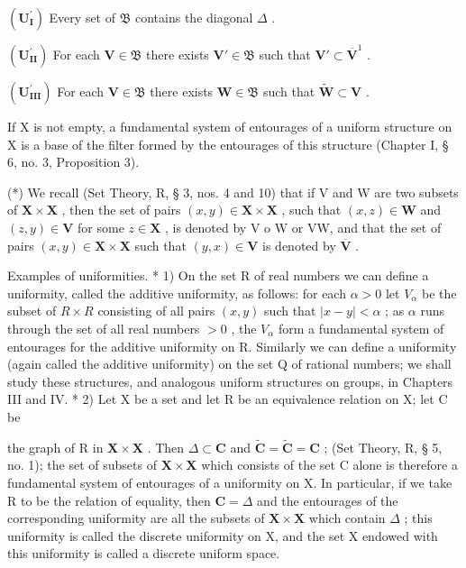 \((\mathbf{U}_{\mathbf{I}}^{\prime})\) Every set of \(\mathfrak{B}\) contains the diagonal \(\Delta\) .

\((\mathbf{U}_{\mathbf{II}}^{\prime})\) For each \(\mathbf{V} \in \mathfrak{B}\) there exists \(\mathbf{V}' \in \mathfrak{B}\) such that \(\mathbf{V}' \subset \overline{\mathbf{V}}^1\) .

\((\mathbf{U}_{\mathbf{III}}^{\prime})\) For each \(\mathbf{V} \in \mathfrak{B}\) there exists \(\mathbf{W} \in \mathfrak{B}\) such that \(\tilde{\mathbf{W}} \subset \mathbf{V}\) .

If X is not empty, a fundamental system of entourages of a uniform structure on X is a base of the filter formed by the entourages of this structure (Chapter I, § 6, no. 3, Proposition 3).

(*) We recall (Set Theory, R, § 3, nos. 4 and 10) that if V and W are two subsets of \(\mathbf{X} \times \mathbf{X}\) , then the set of pairs \((x, y) \in \mathbf{X} \times \mathbf{X}\) , such that \((x, z) \in \mathbf{W}\) and \((z, y) \in \mathbf{V}\) for some \(z \in \mathbf{X}\) , is denoted by V o W or VW, and that the set of pairs \((x, y) \in \mathbf{X} \times \mathbf{X}\) such that \((y, x) \in \mathbf{V}\) is denoted by \(\overline{\mathbf{V}}\) .

Examples of uniformities. * 1) On the set R of real numbers we can define a uniformity, called the additive uniformity, as follows: for each \(\alpha > 0\) let \(V_{\alpha}\) be the subset of \(R \times R\) consisting of all pairs \((x, y)\) such that \(|x - y| < \alpha\) ; as \(\alpha\) runs through the set of all real numbers \(> 0\) , the \(V_{\alpha}\) form a fundamental system of entourages for the additive uniformity on R. Similarly we can define a uniformity (again called the additive uniformity) on the set Q of rational numbers; we shall study these structures, and analogous uniform structures on groups, in Chapters III and IV. * 2) Let X be a set and let R be an equivalence relation on X; let C be

the graph of R in \(\mathbf{X} \times \mathbf{X}\) . Then \(\Delta \subset \mathbf{C}\) and \(\tilde{\mathbf{C}} = \tilde{\mathbf{C}} = \mathbf{C}\) ; (Set Theory, R, § 5, no. 1); the set of subsets of \(\mathbf{X} \times \mathbf{X}\) which consists of the set C alone is therefore a fundamental system of entourages of a uniformity on X. In particular, if we take R to be the relation of equality, then \(\mathbf{C} = \Delta\) and the entourages of the corresponding uniformity are all the subsets of \(\mathbf{X} \times \mathbf{X}\) which contain \(\Delta\) ; this uniformity is called the discrete uniformity on X, and the set X endowed with this uniformity is called a discrete uniform space.


